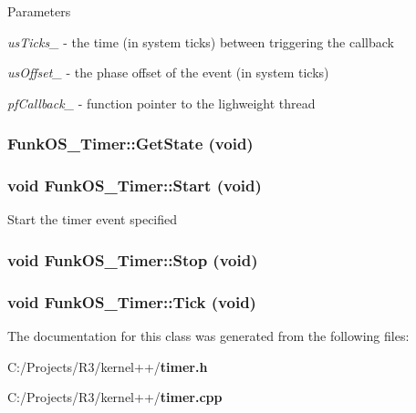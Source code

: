 \begin{DoxyParams}{Parameters}
\item[{\em usTicks\_\-}]-\/ the time (in system ticks) between triggering the callback \item[{\em usOffset\_\-}]-\/ the phase offset of the event (in system ticks) \item[{\em pfCallback\_\-}]-\/ function pointer to the lighweight thread \end{DoxyParams}
\subsubsection[{GetState}]{ FunkOS\_\-Timer::GetState (void)}\label{class_funk_o_s___timer_a8686a777aac2b37f52d98231d04ab71f}
\subsubsection[{Start}]{\setlength{\rightskip}{0pt plus 5cm}void FunkOS\_\-Timer::Start (void)}\label{class_funk_o_s___timer_a6057e50f725e98638ee46376e87b2552}
Start the timer event specified 
\subsubsection[{Stop}]{\setlength{\rightskip}{0pt plus 5cm}void FunkOS\_\-Timer::Stop (void)}\label{class_funk_o_s___timer_aa2c60cb54fe143e7243c444df163ff69}
\subsubsection[{Tick}]{\setlength{\rightskip}{0pt plus 5cm}void FunkOS\_\-Timer::Tick (void)}\label{class_funk_o_s___timer_a5c84516be296873ced1102a5be29c9f2}


The documentation for this class was generated from the following files:\begin{DoxyCompactItemize}
\item 
C:/Projects/R3/kernel++/{\bf timer.h}\item 
C:/Projects/R3/kernel++/{\bf timer.cpp}\end{DoxyCompactItemize}
